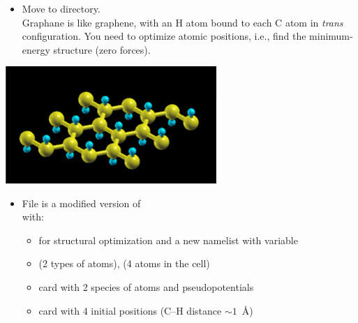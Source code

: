 \documentclass[landscape]{foils}
\begin{document}
\parbox{17cm}{
  \begin{itemize}
  \item Move to  directory.\\[0.5em]
    Graphane is like graphene, with an H atom bound to each C atom in
    {\em trans} configuration. You need to optimize atomic positions,
    i.e., find the minimum-energy structure (zero forces).
  \end{itemize}
} \hskip 1cm
\parbox{8cm}{ \includegraphics[width=8cm]{figs/graphane.pdf}}

\begin{itemize}
\item File  is a modified version of\\
   with:
  \begin{itemize}
  \item {} for structural optimization and a
    new namelist  with variable 
  \item {} (2 types of atoms), 
    (4 atoms in the cell)
  \item {} card with 2 species of atoms and
    pseudopotentials
  \item {} card with 4 initial positions
    (C--H distance $\sim 1$~\AA)
  \end{itemize}
\end{itemize}
\end{document}
